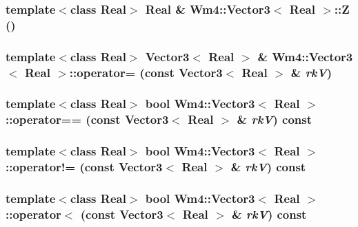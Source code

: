 \subsubsection{\setlength{\rightskip}{0pt plus 5cm}template$<$class Real$>$ Real \& {\bf Wm4::Vector3}$<$ Real $>$::Z ()\hspace{0.3cm}{\tt  [inline]}}\label{classWm4_1_1Vector3_792db4bd00e018eea9d3be13506b6558}


\subsubsection{\setlength{\rightskip}{0pt plus 5cm}template$<$class Real$>$ {\bf Vector3}$<$ Real $>$ \& {\bf Wm4::Vector3}$<$ Real $>$::operator= (const {\bf Vector3}$<$ Real $>$ \& {\em rk\-V})\hspace{0.3cm}{\tt  [inline]}}\label{classWm4_1_1Vector3_4c462b662e2453a855d2216ae00d4eb1}


\subsubsection{\setlength{\rightskip}{0pt plus 5cm}template$<$class Real$>$ bool {\bf Wm4::Vector3}$<$ Real $>$::operator== (const {\bf Vector3}$<$ Real $>$ \& {\em rk\-V}) const}\label{classWm4_1_1Vector3_f627f662808c5603863d2d7c4202c60a}


\subsubsection{\setlength{\rightskip}{0pt plus 5cm}template$<$class Real$>$ bool {\bf Wm4::Vector3}$<$ Real $>$::operator!= (const {\bf Vector3}$<$ Real $>$ \& {\em rk\-V}) const}\label{classWm4_1_1Vector3_397a06523c9a33ca92ccf5c3edd172d5}


\subsubsection{\setlength{\rightskip}{0pt plus 5cm}template$<$class Real$>$ bool {\bf Wm4::Vector3}$<$ Real $>$::operator$<$ (const {\bf Vector3}$<$ Real $>$ \& {\em rk\-V}) const}\label{classWm4_1_1Vector3_3e9a9c63a62a44e5745aeb9071bf4f55}


